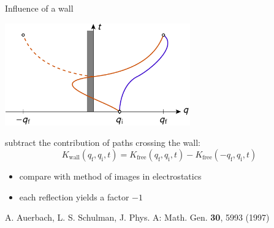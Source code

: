 \documentclass[t,dvipsnames]{beamer}
\begin{document}
\begin{frame}[t]{Influence of a wall}
 \begin{center}
  \includegraphics[width=0.6\textwidth]{wall}
 \end{center}

 subtract the contribution of paths crossing the wall:
 \begin{displaymath}
  K_\text{wall}(q_\text{f}, q_\text{i}, t)
  = K_\text{free}(q_\text{f}, q_\text{i}, t) - K_\text{free}(-q_\text{f}, q_\text{i}, t)
 \end{displaymath}

 \begin{itemize}
  \item compare with method of images in electrostatics
  \item each reflection yields a factor $-1$
 \end{itemize}

 \begin{footnotesize}
  \begin{flushright}
   A. Auerbach, L. S. Schulman, J. Phys. A: Math. Gen. \textbf{30}, 5993 (1997)
  \end{flushright}
 \end{footnotesize}
\end{frame}
\end{document}
